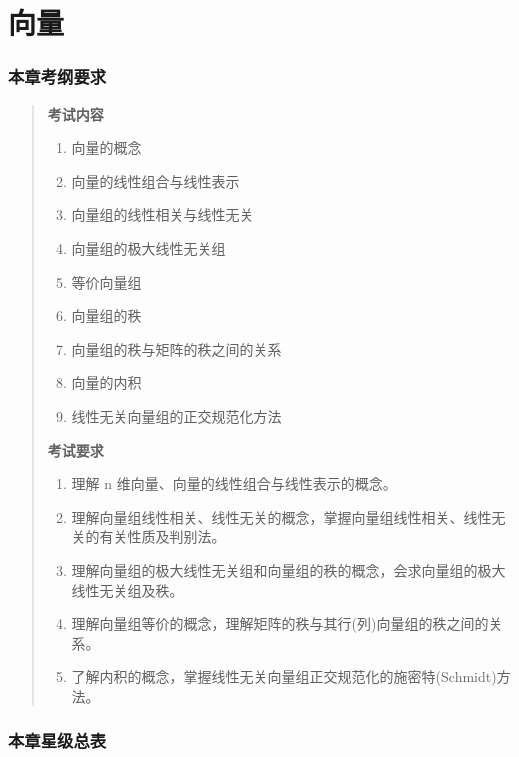 \documentclass[11pt,openany,UTF8]{ctexbook}
\begin{document}
\chapter{向量}
\subsection*{本章考纲要求}

\begin{quote}
\textbf{考试内容}

\begin{enumerate}
\item 向量的概念
\item 向量的线性组合与线性表示
\item 向量组的线性相关与线性无关
\item 向量组的极大线性无关组
\item 等价向量组
\item 向量组的秩
\item 向量组的秩与矩阵的秩之间的关系
\item 向量的内积
\item 线性无关向量组的正交规范化方法
\end{enumerate}
\textbf{考试要求}

\begin{enumerate}
\item 理解 n 维向量、向量的线性组合与线性表示的概念。
\item 理解向量组线性相关、线性无关的概念，掌握向量组线性相关、线性无关的有关性质及判别法。
\item 理解向量组的极大线性无关组和向量组的秩的概念，会求向量组的极大线性无关组及秩。
\item 理解向量组等价的概念，理解矩阵的秩与其行(列)向量组的秩之间的关系。
\item 了解内积的概念，掌握线性无关向量组正交规范化的施密特(Schmidt)方法。
\end{enumerate}
\end{quote}
\subsection*{本章星级总表}
\end{document}
